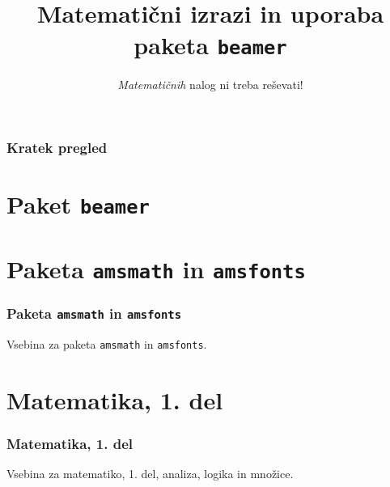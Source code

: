 \documentclass{beamer}
\begin{document}

\title{Matematični izrazi in uporaba paketa \texttt{beamer}}
\subtitle{\emph{Matematičnih} nalog ni treba reševati!}
\date{}
\frame{\titlepage}

\begin{frame}
    \frametitle{Kratek pregled}
    \tableofcontents %
    \end{frame}


\section{Paket \texttt{beamer}}

    
\section{Paketa \texttt{amsmath} in \texttt{amsfonts}}
    \begin{frame}
      \frametitle{Paketa \texttt{amsmath} in \texttt{amsfonts}}
      Vsebina za paketa \texttt{amsmath} in \texttt{amsfonts}.
    \end{frame}
    
    
\section[Matematika, 1. del\\\large{Analiza, logika, množice}]{Matematika, 1. del}
    \begin{frame}
      \frametitle{Matematika, 1. del}
      Vsebina za matematiko, 1. del, analiza, logika in množice.
    \end{frame}
    
\end{document}
